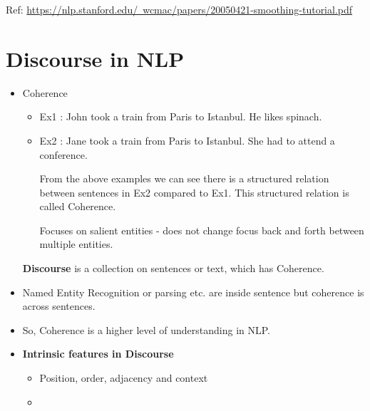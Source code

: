 \documentclass[12pt]{article}
\begin{document}
            Ref: \href{https://nlp.stanford.edu/~wcmac/papers/20050421-smoothing-tutorial.pdf}{https://nlp.stanford.edu/~wcmac/papers/20050421-smoothing-tutorial.pdf}


\section{Discourse in NLP} 
    \begin{itemize}
        \item Coherence
        \begin{itemize}
            \item Ex1 : John took a train from Paris to Istanbul. He likes spinach.
            \item Ex2 : Jane took a train from Paris to Istanbul. She had to attend a conference.
            
            From the above examples we can see there is a structured relation between sentences in Ex2
            compared to Ex1. This structured relation is called Coherence.

            Focuses on salient entities - does not change focus back and forth between multiple entities.
        \end{itemize}
        \textbf{Discourse} is a collection on sentences or text, which has Coherence.
        \item Named Entity Recognition or parsing etc. are inside sentence but coherence is across sentences.
        \item So, Coherence is a higher level of understanding in NLP.
        \item \textbf{Intrinsic features in Discourse}
            \begin{itemize}
                \item Position, order, adjacency and context
                \item 
            \end{itemize}


\end{itemize}
\end{document}
